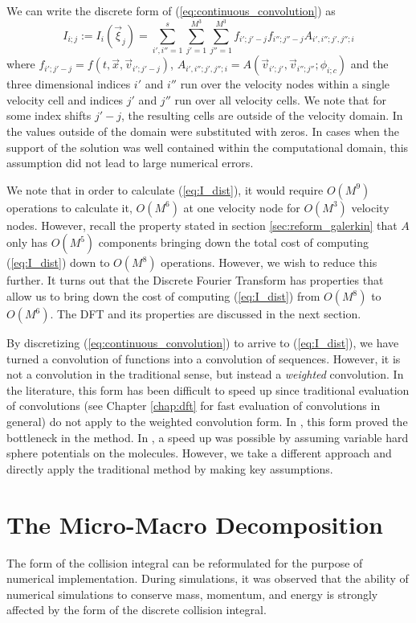 \documentclass[12pt]{CSUNthesis}
\begin{document}
We can write the discrete form of (\ref{eq:continuous_convolution}) as 
\begin{equation}
\label{eq:I_dist}
I_{i;j}:=I_{i}(\vec{\xi}_{j}) = \sum_{i',i''=1}^s  \sum_{j'=1}^{M^3} \sum_{j''=1}^{M^3} f_{i';j'-j} f_{i'';j''-j} A_{i',i'';j',j'';i} 
\end{equation}
where $f_{i';j'-j}=f(t,\vec{x},\vec{v}_{i';j'-j})$, 
$A_{i',i'';j',j'';i}=A(\vec{v}_{i';j'},\vec{v}_{i'';j''}; \phi_{i;c})$ and the three dimensional 
indices $i'$ and $i''$ run over the velocity nodes within a single velocity cell 
and indices $j'$ and $j''$ run over all velocity cells. We note that for some index 
shifts $j'-j$, the resulting cells are outside of the velocity domain. 
In \cite{AlekseenkoJosyula2012a} the values outside of the domain 
were substituted with zeros. In cases when the support of the solution 
was well contained within the computational domain, this assumption did not lead to 
large numerical errors. 

We note that in order to calculate (\ref{eq:I_dist}), it would require $O(M^9)$ operations to calculate it, $O(M^6)$ at one velocity node for $O(M^3)$ velocity nodes. However, recall the property stated in section \ref{sec:reform_galerkin} that $A$ only has $O(M^5)$ components bringing down the total cost of computing (\ref{eq:I_dist}) down to $O(M^8)$ operations. However, we wish to reduce this further. It turns out that the Discrete Fourier Transform has properties that allow us to bring down the cost of computing (\ref{eq:I_dist}) from $O(M^8)$ to $O(M^6)$. The DFT and its properties are discussed in the next section.

By discretizing (\ref{eq:continuous_convolution}) to arrive to (\ref{eq:I_dist}), we have turned a convolution of functions into a convolution of sequences. However, it is not a convolution in the traditional sense, but instead a \textit{weighted} convolution. In the literature, this form has been difficult to speed up since traditional evaluation of convolutions (see Chapter \ref{chap:dft} for fast evaluation of convolutions in general) do not apply to the weighted convolution form. In \cite{PareschiPerthame1996}, this form proved the bottleneck in the method. In \cite{GambaHaakHauckHu2017}, a speed up was possible by assuming variable hard sphere potentials on the molecules. However, we take a different approach and directly apply the traditional method by making key assumptions.

\section{The Micro-Macro Decomposition}
The form of the collision integral can be reformulated for the purpose of numerical implementation. During simulations, it was observed that the ability of numerical simulations to conserve mass, momentum, and energy is strongly affected by the form of the discrete collision integral. 
\end{document}
